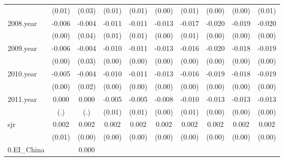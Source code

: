 {\begin{tabular}{l*{9}{c}}
          &   (0.01)         &   (0.03)         &   (0.01)         &   (0.01)         &   (0.00)         &   (0.01)         &   (0.00)         &   (0.00)         &   (0.01)         \\
[1em]
2008.year &   -0.006\sym{**} &   -0.004\sym{*}  &   -0.011\sym{**} &   -0.011\sym{**} &   -0.013\sym{**} &   -0.017\sym{**} &   -0.020\sym{**} &   -0.019\sym{**} &   -0.020\sym{**} \\
          &   (0.00)         &   (0.04)         &   (0.01)         &   (0.01)         &   (0.00)         &   (0.01)         &   (0.00)         &   (0.00)         &   (0.00)         \\
[1em]
2009.year &   -0.006\sym{***}&   -0.004\sym{*}  &   -0.010\sym{***}&   -0.011\sym{**} &   -0.013\sym{***}&   -0.016\sym{**} &   -0.020\sym{***}&   -0.018\sym{***}&   -0.019\sym{***}\\
          &   (0.00)         &   (0.03)         &   (0.00)         &   (0.00)         &   (0.00)         &   (0.00)         &   (0.00)         &   (0.00)         &   (0.00)         \\
[1em]
2010.year &   -0.005\sym{***}&   -0.004\sym{*}  &   -0.010\sym{***}&   -0.011\sym{***}&   -0.013\sym{***}&   -0.016\sym{***}&   -0.019\sym{***}&   -0.018\sym{***}&   -0.019\sym{***}\\
          &   (0.00)         &   (0.02)         &   (0.00)         &   (0.00)         &   (0.00)         &   (0.00)         &   (0.00)         &   (0.00)         &   (0.00)         \\
[1em]
2011.year &    0.000         &    0.000         &   -0.005\sym{*}  &   -0.005\sym{*}  &   -0.008\sym{**} &   -0.010\sym{**} &   -0.013\sym{**} &   -0.013\sym{**} &   -0.013\sym{**} \\
          &      (.)         &      (.)         &   (0.01)         &   (0.01)         &   (0.00)         &   (0.01)         &   (0.00)         &   (0.00)         &   (0.00)         \\
[1em]
sjr       &    0.002\sym{*}  &    0.002\sym{***}&    0.002\sym{***}&    0.002\sym{***}&    0.002\sym{***}&    0.002\sym{***}&    0.002\sym{***}&    0.002\sym{***}&    0.002\sym{***}\\
          &   (0.01)         &   (0.00)         &   (0.00)         &   (0.00)         &   (0.00)         &   (0.00)         &   (0.00)         &   (0.00)         &   (0.00)         \\
[1em]
0.EI\_China&                  &    0.000         &                  &                  &                  &                  &                  &                  &                  \\

\end{tabular}}

